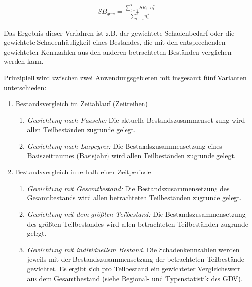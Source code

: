 \begin{eqnarray}
SB_{gew}= \frac{\sum_{t=1}^T SB_t \cdot n^*_t}{\sum_{t=1}^T n^*_t}
\end{eqnarray}

Das Ergebnis dieser Verfahren ist z.B. der gewichtete Schadenbedarf oder die gewichtete Schadenhäufigkeit eines Bestandes, die mit den entsprechenden gewichteten Kennzahlen aus den anderen betrachteten Beständen verglichen werden kann.

Prinzipiell wird zwischen zwei Anwendungsgebieten mit insgesamt fünf Varianten unterschieden:

\begin{enumerate}
\item Bestandsvergleich im Zeitablauf (Zeitreihen)
  \begin{enumerate}
  \item \textit{Gewichtung nach Paasche:} Die aktuelle Bestandszusammenset-zung wird allen Teilbeständen zugrunde gelegt.
  \item \textit{Gewichtung nach Laspeyres:} Die Bestandszusammensetzung eines Basiszeitraumes (Basisjahr) wird allen Teilbeständen zugrunde gelegt.
  \end{enumerate}
\item Bestandsvergleich innerhalb einer Zeitperiode
  \begin{enumerate}
\item \textit{Gewichtung mit Gesamtbestand:} Die Bestandszusammensetzung des Gesamtbestands wird allen betrachteten Teilbeständen zugrunde gelegt.
\item \textit{Gewichtung mit dem größten Teilbestand:} Die Bestandszusammensetzung des größten Teilbestandes wird allen betrachteten Teilbeständen zugrunde gelegt.
\item \textit{Gewichtung mit individuellem Bestand:} Die Schadenkennzahlen werden jeweils mit der Bestandszusammensetzung der betrachteten Teilbestände gewichtet. Es ergibt sich pro Teilbestand ein gewichteter Vergleichswert aus dem Gesamtbestand (siehe Regional- und Typenstatistik des GDV).
  \end{enumerate}
\end{enumerate}



